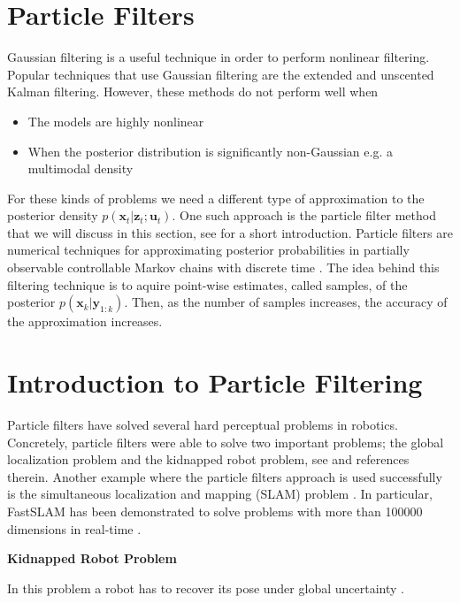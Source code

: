 \section{Particle Filters}
\label{particle_filters}

Gaussian filtering is a useful technique in order to perform nonlinear filtering. Popular techniques that 
use Gaussian filtering are the extended and unscented Kalman filtering. However, these methods do not perform well when

\begin{itemize}
\item The models are highly nonlinear
\item When the posterior distribution is significantly non-Gaussian e.g. a multimodal density
\end{itemize}


For these kinds of problems we need a different type of approximation to the posterior density $p(\mathbf{x}_t | \mathbf{z}_{t}; \mathbf{u}_{t})$. One such approach is the particle filter
method that we will discuss in this section, see \cite{Thurn2002} for a short introduction. 
Particle filters are numerical techniques for approximating posterior probabilities in partially observable controllable Markov 
chains with discrete time \cite{Thurn2002}.  The idea behind this filtering technique is  to aquire point-wise
estimates, called samples, of the posterior $p(\mathbf{x}_k | \mathbf{y}_{1:k})$. Then, as the number of samples increases,
the accuracy of the approximation increases. 

\section{Introduction to Particle Filtering }
\label{particle_filter_introduction}

Particle filters have solved several hard perceptual problems in robotics. Concretely, particle filters were able to solve
two important problems; the global localization problem and the kidnapped robot problem, see \cite{Thurn2002} and references therein.
Another example where the particle filters approach is used successfully is the simultaneous localization and mapping (SLAM) problem \cite{Thurn2002}.
In particular, FastSLAM has been demonstrated to solve problems with more than 100000 dimensions in real-time \cite{Thurn2002}. 

\begin{framed}
\begin{remark}{\textbf{Kidnapped Robot Problem}}

In this problem a robot has to recover its pose under global uncertainty \cite{Thurn2002}.
\end{remark}
\end{framed}

